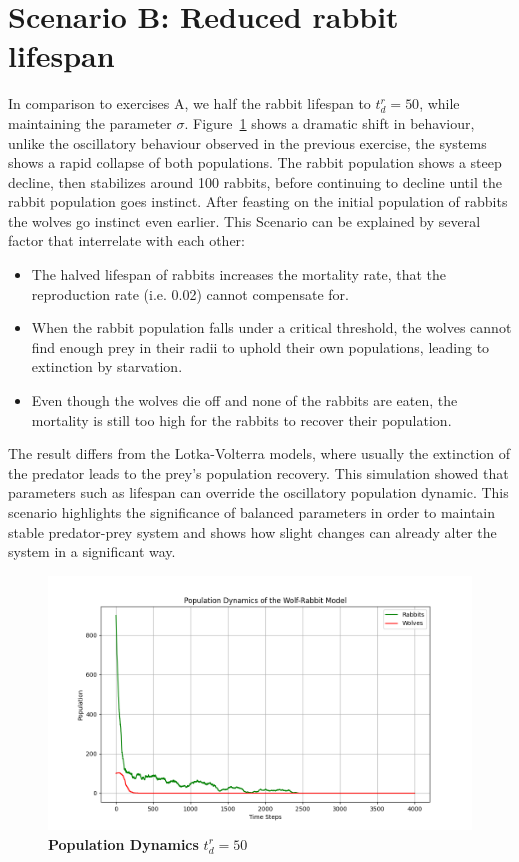 \section{Scenario B: Reduced rabbit lifespan}
In comparison to exercises A, we half the rabbit lifespan to $t_d^r = 50$, while maintaining the parameter $\sigma$.
Figure~\ref{fig:ex02} shows a dramatic shift in behaviour, unlike the oscillatory behaviour observed in the previous exercise, the systems shows a rapid collapse of both populations. The rabbit population shows a steep decline, then stabilizes around 100 rabbits, before continuing to decline until the rabbit population goes instinct. After feasting on the initial population of rabbits the wolves go instinct even earlier.
This Scenario can be explained by several factor that interrelate with each other:
\begin{itemize}
	\item The halved lifespan of rabbits increases the mortality rate, that the reproduction rate (i.e. 0.02) cannot compensate for.
	\item When the rabbit population falls under a critical threshold, the wolves cannot find enough prey in their radii to uphold their own populations, leading to extinction by starvation.
	\item Even though the wolves die off and none of the rabbits are eaten, the mortality is still too high for the rabbits to recover their population.
\end{itemize}
The result differs from the Lotka-Volterra models, where usually the extinction of the predator leads to the prey's population recovery. This simulation showed that parameters such as lifespan can override the oscillatory population dynamic.
This scenario highlights the significance of balanced parameters in order to maintain stable predator-prey system and shows how slight changes can already alter the system in a significant way.
\begin{figure}[H]
\centering
\includegraphics[width=\textwidth]{media/population_dynamics_ex02.png}
\caption{
    \textbf{Population Dynamics}
	$t_d^r = 50$
    }
\label{fig:ex02}
\end{figure}

